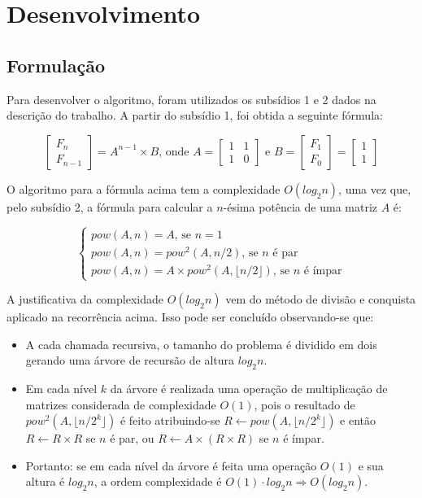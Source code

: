 \section{Desenvolvimento}
	
	\subsection{Formulação}

Para desenvolver o algoritmo, foram utilizados os subsídios 1 e 2 dados na descrição do trabalho. A partir do subsídio 1, foi obtida a seguinte fórmula:

\[
	\begin{bmatrix}
		F_{n}\\
		F_{n-1}
	\end{bmatrix} = A^{n-1} \times B
	\text{, onde }
	A =
	\begin{bmatrix}
		1 & 1\\
		1 & 0
	\end{bmatrix}
	\text{ e }
	B = 
	\begin{bmatrix}
		F_{1}\\
		F_{0}
	\end{bmatrix}
	=
	\begin{bmatrix}
		1\\
		1
	\end{bmatrix}
\]

O algoritmo para a fórmula acima tem a complexidade $O(log_{2}n)$, uma vez que, pelo subsídio 2, a fórmula para calcular a $n$-ésima potência de uma matriz $A$ é:

\[
	\left \{
		\begin{array}{lll}
			pow(A, n) = A\text{, se } n = 1\\
			pow(A, n) = pow^{2}(A, n/2)\text{, se } n \text{ é par}\\
			pow(A, n) = A \times pow^{2}(A, \lfloor n/2 \rfloor)\text{, se } n \text{ é ímpar}
		\end{array}
	\right .
\]

A justificativa da complexidade $O(log_{2}n)$ vem do método de divisão e conquista aplicado na recorrência acima. Isso pode ser concluído observando-se que:

\begin{itemize}
	\item A cada chamada recursiva, o tamanho do problema é dividido em dois gerando uma árvore de recursão de altura $log_{2}n$.
	\item Em cada nível $k$ da árvore é realizada uma operação de multiplicação de matrizes considerada de complexidade $O(1)$, pois o resultado de $pow^{2}(A, \lfloor n/2^{k} \rfloor)$ é feito atribuindo-se $R \gets pow(A , \lfloor n/2^{k} \rfloor)$ e então $R \gets R \times R$ se $n$ é par, ou $R \gets A \times (R \times R)$ se $n$ é ímpar.
	\item Portanto: se em cada nível da árvore é feita uma operação $O(1)$ e sua altura é $log_{2}n$, a ordem complexidade é $O(1) \cdot log_{2}n \Rightarrow O(log_{2}n)$.
\end{itemize}

